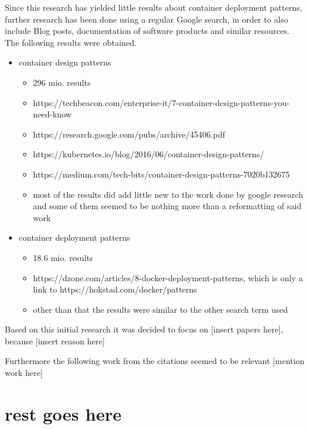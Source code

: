 \documentclass[conference]{IEEEtran}
\begin{document}
Since this research has yielded little results about container deployment patterns, further research has been done using a regular Google search, in order to also include Blog posts, documentation of software products and similar resources. 
The following results were obtained.

\begin{itemize}
\item container design patterns
\begin{itemize}
	\item 296 mio. results
	\item https://techbeacon.com/enterprise-it/7-container-design-patterns-you-need-know
	\item https://research.google.com/pubs/archive/45406.pdf
	\item https://kubernetes.io/blog/2016/06/container-design-patterns/
	\item https://medium.com/tech-bits/container-design-patterns-7020b132675
	\item most of the results did add little new to the work done by google research and some of them seemed to be nothing more than a reformatting of said work
\end{itemize}
\item container deployment patterns
\begin{itemize}
    \item 18.6 mio. results
	\item https://dzone.com/articles/8-docker-deployment-patterns, which is only a link to https://hokstad.com/docker/patterns
	\item other than that the results were similar to the other search term used
\end{itemize}
\end{itemize}

Based on this initial research it was decided to focus on [insert papers here], because [insert reason here]

Furthermore the following work from the citations seemed to be relevant [mention work here]

\section{rest goes here}


{}
\end{document}
